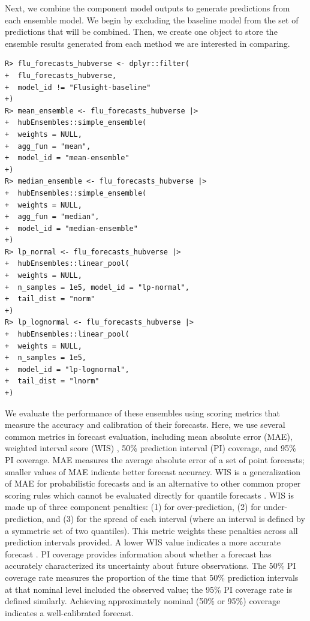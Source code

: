 \documentclass[
  article,
  shortnames,
  notitle]{jss}
\begin{document}
\begin{longtable}[]
\caption{\label{tbl-case-study-flu-forecasts}An example prediction of
weekly incident influenza hospitalizations. The example model output was
made on May 15, 2023 for California at the 1 week ahead horizon. The
forecast was generated during the FluSight forecasting challenge, then
formatted according to hubverse standards post hoc. The
\texttt{location}, \texttt{forecast\_date}, and \texttt{season} columns
have been omitted for brevity.}

\tabularnewline
\end{longtable}

Next, we combine the component model outputs to generate predictions
from each ensemble model. We begin by excluding the baseline model from
the set of predictions that will be combined. Then, we create one object
to store the ensemble results generated from each method we are
interested in comparing.

\begin{verbatim}
R> flu_forecasts_hubverse <- dplyr::filter(
+  flu_forecasts_hubverse,
+  model_id != "Flusight-baseline"
+)
R> mean_ensemble <- flu_forecasts_hubverse |>
+  hubEnsembles::simple_ensemble(
+  weights = NULL,
+  agg_fun = "mean",
+  model_id = "mean-ensemble"
+)
R> median_ensemble <- flu_forecasts_hubverse |>
+  hubEnsembles::simple_ensemble(
+  weights = NULL,
+  agg_fun = "median",
+  model_id = "median-ensemble"
+)
R> lp_normal <- flu_forecasts_hubverse |>
+  hubEnsembles::linear_pool(
+  weights = NULL,
+  n_samples = 1e5, model_id = "lp-normal",
+  tail_dist = "norm"
+)
R> lp_lognormal <- flu_forecasts_hubverse |>
+  hubEnsembles::linear_pool(
+  weights = NULL,
+  n_samples = 1e5,
+  model_id = "lp-lognormal",
+  tail_dist = "lnorm"
+)
\end{verbatim}

We evaluate the performance of these ensembles using scoring metrics
that measure the accuracy and calibration of their forecasts. Here, we
use several common metrics in forecast evaluation, including mean
absolute error (MAE), weighted interval score (WIS)
\citep{bracher_evaluating_2021}, 50\% prediction interval (PI) coverage,
and 95\% PI coverage. MAE measures the average absolute error of a set
of point forecasts; smaller values of MAE indicate better forecast
accuracy. WIS is a generalization of MAE for probabilistic forecasts and
is an alternative to other common proper scoring rules which cannot be
evaluated directly for quantile forecasts
\citep{bracher_evaluating_2021}. WIS is made up of three component
penalties: (1) for over-prediction, (2) for under-prediction, and (3)
for the spread of each interval (where an interval is defined by a
symmetric set of two quantiles). This metric weights these penalties
across all prediction intervals provided. A lower WIS value indicates a
more accurate forecast \citep{bracher_evaluating_2021}. PI coverage
provides information about whether a forecast has accurately
characterized its uncertainty about future observations. The \(50\)\% PI
coverage rate measures the proportion of the time that 50\% prediction
intervals at that nominal level included the observed value; the 95\% PI
coverage rate is defined similarly. Achieving approximately nominal
(50\% or 95\%) coverage indicates a well-calibrated forecast.
\end{document}
